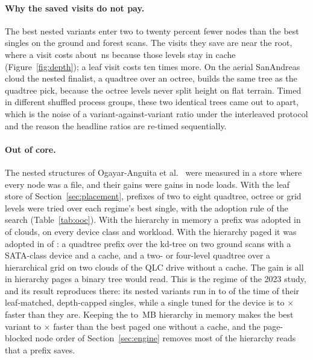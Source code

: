 \paragraph{Why the saved visits do not pay.} The best nested variants enter two to twenty percent fewer nodes than the best singles on the ground and forest scans. The visits they save are near the root, where a visit costs about \savedVisitCostNs\,ns because those levels stay in cache (Figure~\ref{fig:depth}); a leaf visit costs ten times more. On the aerial SanAndreas cloud the nested finalist, a quadtree over an octree, builds the same tree as the quadtree pick, because the octree levels never split height on flat terrain. Timed in different shuffled process groups, these two identical trees came out \nullPairMin{} to \nullPairMax{} apart, which is the noise of a variant-against-variant ratio under the interleaved protocol and the reason the headline ratios are re-timed sequentially.

\begin{table}[t]
\centering\footnotesize
\caption{Out of core, modelled devices: the best nested prefix over each regime's best single, geometric mean and range over clouds, and the clouds in which a prefix was adopted (at least 3\% faster in every process). Hierarchy \emph{in RAM}: leaves on the device; \emph{paged}: the hierarchy read page by page as well.}
\label{tab:ooc}

\end{table}

\paragraph{Out of core.} The nested structures of Ogayar-Anguita et al.~\cite{ogayar2023nestedlidar} were measured in a store where every node was a file, and their gains were gains in node loads. With the leaf store of Section~\ref{sec:placement}, prefixes of two to eight quadtree, octree or grid levels were tried over each regime's best single, with the adoption rule of the search (Table~\ref{tab:ooc}). With the hierarchy in memory a prefix was adopted in \oocInRamAdopted{} of \oocInRamCells{} clouds, on every device class and workload. With the hierarchy paged it was adopted in \oocPagedAdopted{} of \oocPagedCells{}: a quadtree prefix over the kd-tree on two ground scans with a SATA-class device and a cache, and a two- or four-level quadtree over a hierarchical grid on two clouds of the QLC drive without a cache. The gain is all in hierarchy pages a binary tree would read. This is the regime of the 2023 study, and its result reproduces there: its nested variants run in \isprsOverLeafMatchedMin{} to \isprsOverLeafMatchedMax{} of the time of their leaf-matched, depth-capped singles, while a single tuned for the device is \isprsOverBestSingleMin{} to \isprsOverBestSingleMax$\times$ faster than they are. Keeping the \hierarchyMbMin{} to \hierarchyMbMax\,MB hierarchy in memory makes the best variant \pagedOverPinnedMinNoCache{} to \pagedOverPinnedMaxNoCache$\times$ faster than the best paged one without a cache, and the page-blocked node order of Section~\ref{sec:engine} removes most of the hierarchy reads that a prefix saves.

